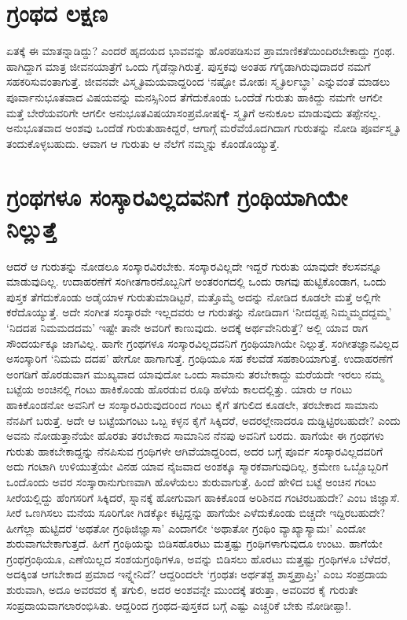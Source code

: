 \section*{ಗ್ರಂಥದ ಲಕ್ಷಣ}

ಏತಕ್ಕೆ ಈ ಮಾತನ್ನಾಡಿದ್ದು? ಎಂದರೆ ಹೃದಯದ ಭಾವವನ್ನು ಹೊರಪಡಿಸುವ ಪ್ರಾಮಾಣಿಕತೆಯಿಂದಿರಬೇಕಾದ್ದು ಗ್ರಂಥ. ಹಾಗಿದ್ದಾಗ ಮಾತ್ರ ಜೀವನಯಾತ್ರೆಗೆ ಒಂದು ಗೈಡೆನ್ಸಾಗಿರುತ್ತೆ. ಪುಸ್ತಕವು ಅಂತಹ ಗಗೈಡಾಗಿರುವುದಾದರೆ ನಮಗೆ ಸಹಕರಿಸುವಂತಾಗುತ್ತೆ. ಜೀವನವೇ ವಿಸ್ಮೃತಿಮಯವಾದ್ದರಿಂದ `ನಷ್ಟೋ ಮೋಹಃ ಸ್ಮೃತಿರ್ಲಬ್ಧಾ'\label{104} ಎನ್ನುವಂತೆ ಮಾಡಲು ಪೂರ್ವಾನುಭೂತವಾದ ವಿಷಯವನ್ನು ಮನಸ್ಸಿನಿಂದ ತೆಗೆದುಕೊಂಡು ಒಂದೆಡೆ ಗುರುತು ಹಾಕಿದ್ದು ನಮಗೇ ಆಗಲೀ ಮತ್ತೆ ಬೇರೆಯವರಿಗೇ ಆಗಲೀ ಅನುಭೂತವಿಷಯಾಸಂಪ್ರಮೋಷಕ್ಕೆ- ಸ್ಮೃತಿಗೆ ಅನುಕೂಲ ಮಾಡುವುದು ತಪ್ಪೇನಲ್ಲ. ಅನುಭೂತವಾದ ಅಂಶವು ಒಂದೆಡೆ ಗುರುತುಹಾಕಿದ್ದರೆ, ಆಗಾಗ್ಗೆ ಮರೆವೆಯೊದಗಿದಾಗ ಗುರುತನ್ನು ನೋಡಿ ಪೂರ್ವಸ್ಮೃತಿ ತಂದುಕೊಳ್ಳಬಹುದು. ಆವಾಗ ಆ ಗುರುತು ಆ ನೆಲೆಗೆ ನಮ್ಮನ್ನು ಕೊಂಡೊಯ್ಯುತ್ತೆ. 

\section*{ಗ್ರಂಥಗಳೂ ಸಂಸ್ಕಾರವಿಲ್ಲದವನಿಗೆ ಗ್ರಂಥಿಯಾಗಿಯೇ ನಿಲ್ಲುತ್ತೆ}

ಆದರೆ ಆ ಗುರುತನ್ನು ನೋಡಲೂ ಸಂಸ್ಕಾರವಿರಬೇಕು. ಸಂಸ್ಕಾರವಿಲ್ಲದೇ ಇದ್ದರೆ ಗುರುತು ಯಾವುದೇ ಕೆಲಸವನ್ನೂ ಮಾಡುವುದಿಲ್ಲ. ಉದಾಹರಣೆಗೆ ಸಂಗೀತಗಾರನೊಬ್ಬನಿಗೆ ಅಂತರಂಗದಲ್ಲಿ ಒಂದು ರಾಗವು ಹುಟ್ಟಿಕೊಂಡಾಗ, ಒಂದು ಪುಸ್ತಕ ತೆಗೆದುಕೊಂಡು ಅಡೈಯಾಳ ಗುರುತುಮಾಡಿಟ್ಟರೆ, ಮತ್ತೊಮ್ಮೆ ಅದನ್ನು ನೋಡಿದ ಕೂಡಲೇ ಮತ್ತೆ ಅಲ್ಲಿಗೇ ಕರೆದೊಯ್ಯುತ್ತೆ. ಅದೇ ಸಂಗೀತ ಸಂಸ್ಕಾರವೇ ಇಲ್ಲದವರು ಆ ಗುರುತನ್ನು ನೋಡಿದಾಗ `ನೀದದ್ದಪ್ಪ ನಿಮ್ಮಮ್ಮದದ್ದಮ್ಮ' `ನಿದದಪ ನಿಮಮದದಮ' ಇಷ್ಟೇ ತಾನೇ ಅವರಿಗೆ ಕಾಣುವುದು. ಅದಕ್ಕೆ ಅರ್ಥವೇನಿರುತ್ತೆ? ಅಲ್ಲಿ ಯಾವ ರಾಗ ಸೌಂದರ್ಯಕ್ಕೂ ಜಾಗವಿಲ್ಲ. ಹಾಗೇ ಗ್ರಂಥಗಳೂ ಸಂಸ್ಕಾರವಿಲ್ಲದವನಿಗೆ ಗ್ರಂಥಿಯಾಗಿಯೇ ನಿಲ್ಲುತ್ತೆ.  ಸಂಗೀತಜ್ಞಾನವಿಲ್ಲದ ಅಸಂಸ್ಕಾರಿಗೆ `ನಿಮಮ ದದಪ' ಹೇಗೋ ಹಾಗಾಗುತ್ತೆ. ಗ್ರಂಥಿಯೂ ಸಹ ಕೆಲವೆಡೆ ಸಹಕಾರಿಯಾಗುತ್ತೆ. ಉದಾಹರಣೆಗೆ ಅಂಗಡಿಗೆ ಹೊರಡುವಾಗ ಮುಖ್ಯವಾದ ಯಾವುದೋ ಒಂದು ಸಾಮಾನು ತರಬೇಕಾದ್ದು ಮರೆಯದೇ ಇರಲು ನಮ್ಮ ಬಟ್ಟೆಯ ಅಂಚಿನಲ್ಲಿ ಗಂಟು ಹಾಕಿಕೊಂಡು ಹೊರಡುವ ರೂಢಿ ಹಳೆಯ ಕಾಲದಲ್ಲಿತ್ತು. ಯಾರು ಆ ಗಂಟು ಹಾಕಿಕೊಂಡನೋ ಅವನಿಗೆ ಆ ಸಂಸ್ಕಾರವಿರುವುದರಿಂದ ಗಂಟು ಕೈಗೆ ತಗುಲಿದ ಕೂಡಲೇ, ತರಬೇಕಾದ ಸಾಮಾನು ನೆನಪಿಗೆ ಬರುತ್ತೆ. ಅದೇ ಆ ಬಟ್ಟೆಯಗಂಟು ಒಬ್ಬ ಕಳ್ಳನ ಕೈಗೆ ಸಿಕ್ಕಿದರೆ, ಅದರಲ್ಲೇನಾದರೂ ದುಡ್ಡಿಟ್ಟಿರಬಹುದೇ? ಎಂದು ಅವನು ನೋಡುತ್ತಾನೆಯೇ ಹೊರತು ತರಬೇಕಾದ ಸಾಮಾನಿನ ನೆನಪು ಅವನಿಗೆ ಬರದು. ಹಾಗೆಯೇ ಈ ಗ್ರಂಥಗಳು ಗುರುತು ಹಾಕಬೇಕಾದ್ದನ್ನು  ನೆನಪಿಸುವ ಗ್ರಂಥಿಗಳೇ ಆಗಿವೆಯಾದ್ದರಿಂದ, ಅದರ ಬಗ್ಗೆ ಪೂರ್ವ ಸಂಸ್ಕಾರವಿಲ್ಲದವರಿಗೆ ಅದು ಗಂಟಾಗಿ ಉಳಿಯುತ್ತೆಯೇ ವಿನಹ ಯಾವ ನೈಜವಾದ ಅಂಶಕ್ಕೂ ಸ್ಮಾರಕವಾಗುವುದಿಲ್ಲ. ಕ್ರಮೇಣ ಒಬ್ಬೊಬ್ಬರಿಗೆ ಒಂದೊಂದು ಅವರ ಸಂಸ್ಕಾರಾನುಗುಣವಾಗಿ ಹೊಳೆಯಲು ಶುರುವಾಗುತ್ತೆ. ಹಿಂದೆ ಹೇಳಿದ ಬಟ್ಟೆ ಅಂಚಿನ ಗಂಟು ಸೀರೆಯಲ್ಲಿದ್ದು ಹೆಂಗಸರಿಗೆ ಸಿಕ್ಕಿದರೆ, ಸ್ನಾನಕ್ಕೆ ಹೋಗುವಾಗ ಹಾಕಿಕೊಂಡ ಅರಿಶಿನದ ಗಂಟಿರಬಹುದೇ? ಎಂಬ ಜಿಜ್ಞಾಸೆ. ಸೀರೆ ಒಣಗಿಸಲು ಮನೆಯ ಸೂರಿಗೋ ಗಿಡಕ್ಕೋ ಕಟ್ಟಿದ್ದನ್ನು ಹಾಗೆಯೇ ಎಳೆದುಕೊಂಡು ಬಿಚ್ಚದೇ ಇದ್ದಿರಬಹುದೇ? ಹೀಗೆಲ್ಲಾ ಹುಟ್ಟಿದರೆ `ಅಥತೋ ಗ್ರಂಥಿಜಿಜ್ಞಾಸಾ' ಎಂದಾಗಲೀ `ಅಥಾತೋ ಗ್ರಂಥಿಂ ವ್ಯಾಖ್ಯಾಸ್ಯಾಮಃ' ಎಂದೋ ಶುರುವಾಗಬೇಕಾಗುತ್ತದೆ. ಹೀಗೆ ಗ್ರಂಥಿಯನ್ನು ಬಿಡಿಸಹೊರಟು ಮತ್ತಷ್ಟು ಗ್ರಂಥಿಗಳಾಗುವುದೂ ಉಂಟು. ಹಾಗೆಯೇ ಗ್ರಂಥಗ್ರಂಥಿಯೂ, ಎಣೆಯಿಲ್ಲದ ಸಂಶಯಗ್ರಂಥಿಗಳೂ, ಅವನ್ನು ಬಿಡಿಸಲು ಹೊರಟು ಮತ್ತಷ್ಟು  ಗ್ರಂಥಿಗಳೂ ಬೆಳೆದರೆ, ಅದಕ್ಕಿಂತ ಆಗಬೇಕಾದ ಪ್ರಮಾದ ಇನ್ನ್ನೇನಿದೆ? ಆದ್ದರಿಂದಲೇ `ಗ್ರಂಥತಃ ಅರ್ಥತಶ್ಚ ಶಾಸ್ತ್ರಪ್ರಾಪ್ತಿಃ'\label{105} ಎಂಬ ಸಂಪ್ರದಾಯ ಶುರುವಾಗಿ, ಅದೂ ಅವರವರ ಕೈ ತಗುಲಿ, ಅದರ ಅಂಶವನ್ನೇ ಮುಂದಕ್ಕೆ ತರುತ್ತಾ, ಅವರಿವರ ಕೈ ಗುರುತೇ ಸಂಪ್ರದಾಯವಾಗಲಾರಂಭಿಸಿತು. ಆದ್ದರಿಂದ ಗ್ರಂಥದ-ಪುಸ್ತಕದ ಬಗ್ಗೆ ಎಷ್ಟು ಎಚ್ಚರಿಕೆ ಬೇಕು ನೋಡೀಪ್ಪಾ!.

